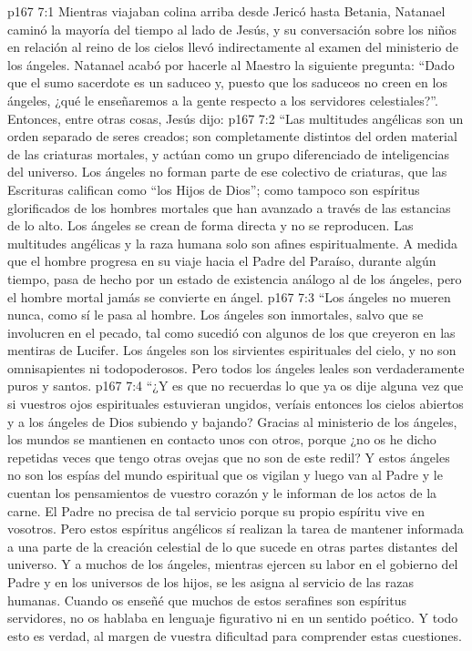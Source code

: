 \vs p167 7:1 Mientras viajaban colina arriba desde Jericó hasta Betania, Natanael caminó la mayoría del tiempo al lado de Jesús, y su conversación sobre los niños en relación al reino de los cielos llevó indirectamente al examen del ministerio de los ángeles. Natanael acabó por hacerle al Maestro la siguiente pregunta: “Dado que el sumo sacerdote es un saduceo y, puesto que los saduceos no creen en los ángeles, ¿qué le enseñaremos a la gente respecto a los servidores celestiales?”. Entonces, entre otras cosas, Jesús dijo:
\vs p167 7:2 \pc “Las multitudes angélicas son un orden separado de seres creados; son completamente distintos del orden material de las criaturas mortales, y actúan como un grupo diferenciado de inteligencias del universo. Los ángeles no forman parte de ese colectivo de criaturas, que las Escrituras califican como “los Hijos de Dios”; como tampoco son espíritus glorificados de los hombres mortales que han avanzado a través de las estancias de lo alto. Los ángeles se crean de forma directa y no se reproducen. Las multitudes angélicas y la raza humana solo son afines espiritualmente. A medida que el hombre progresa en su viaje hacia el Padre del Paraíso, durante algún tiempo, pasa de hecho por un estado de existencia análogo al de los ángeles, pero el hombre mortal jamás se convierte en ángel.
\vs p167 7:3 “Los ángeles no mueren nunca, como sí le pasa al hombre. Los ángeles son inmortales, salvo que se involucren en el pecado, tal como sucedió con algunos de los que creyeron en las mentiras de Lucifer. Los ángeles son los sirvientes espirituales del cielo, y no son omnisapientes ni todopoderosos. Pero todos los ángeles leales son verdaderamente puros y santos.
\vs p167 7:4 “¿Y es que no recuerdas lo que ya os dije alguna vez que si vuestros ojos espirituales estuvieran ungidos, veríais entonces los cielos abiertos y a los ángeles de Dios subiendo y bajando? Gracias al ministerio de los ángeles, los mundos se mantienen en contacto unos con otros, porque ¿no os he dicho repetidas veces que tengo otras ovejas que no son de este redil? Y estos ángeles no son los espías del mundo espiritual que os vigilan y luego van al Padre y le cuentan los pensamientos de vuestro corazón y le informan de los actos de la carne. El Padre no precisa de tal servicio porque su propio espíritu vive en vosotros. Pero estos espíritus angélicos sí realizan la tarea de mantener informada a una parte de la creación celestial de lo que sucede en otras partes distantes del universo. Y a muchos de los ángeles, mientras ejercen su labor en el gobierno del Padre y en los universos de los hijos, se les asigna al servicio de las razas humanas. Cuando os enseñé que muchos de estos serafines son espíritus servidores, no os hablaba en lenguaje figurativo ni en un sentido poético. Y todo esto es verdad, al margen de vuestra dificultad para comprender estas cuestiones.

